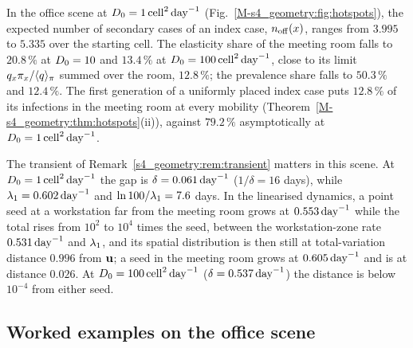 In the office scene at $D_0=1\,\mathrm{cell}^2\,\mathrm{day}^{-1}$ (Fig.~\ref{M-s4_geometry:fig:hotspots}),
the expected number of secondary cases of an index case, $n_{\mathrm{off}}(x)$, ranges from $3.995$ to $5.335$ over the
starting cell.
The elasticity share of the meeting room falls to $20.8\,\%$ at $D_0=10$ and $13.4\,\%$ at $D_0=100\,\mathrm{cell}^2\,\mathrm{day}^{-1}$,
close to its limit $q_x\pi_x/\langle q\rangle_{\pi}$ summed over the room, $12.8\,\%$; the prevalence share falls to
$50.3\,\%$ and $12.4\,\%$.
The first generation of a uniformly placed index case puts $12.8\,\%$ of its infections in the meeting room
at every mobility (Theorem~\ref{M-s4_geometry:thm:hotspots}(ii)), against $79.2\,\%$ asymptotically at
$D_0=1\,\mathrm{cell}^2\,\mathrm{day}^{-1}$.

The transient of Remark~\ref{s4_geometry:rem:transient} matters in this scene. At $D_0=1\,\mathrm{cell}^2\,\mathrm{day}^{-1}$ the gap is
$\delta=0.061\,\mathrm{day}^{-1}$ ($1/\delta=16$ days), while $\lambda_1=0.602\,\mathrm{day}^{-1}$ and $\ln100/\lambda_1=7.6$ days. In the
linearised dynamics, a point seed at a workstation far from the meeting room grows at $0.553\,\mathrm{day}^{-1}$ while
the total rises from $10^2$ to $10^4$ times the seed, between the workstation-zone rate $0.531\,\mathrm{day}^{-1}$ and
$\lambda_1$, and its spatial distribution is then still at total-variation distance $0.996$ from $\mathbf{u}$; a seed
in the meeting room grows at $0.605\,\mathrm{day}^{-1}$ and is at distance $0.026$.
At $D_0=100\,\mathrm{cell}^2\,\mathrm{day}^{-1}$ ($\delta=0.537\,\mathrm{day}^{-1}$) the distance is below $10^{-4}$ from either seed.

\subsection{Worked examples on the office scene}\label{appS_geometry:sec:examples}\label{s4_geometry:sec:examplesdetail}

